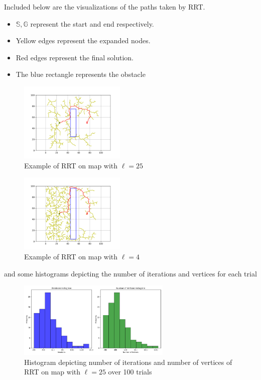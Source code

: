 \documentclass{article}
\begin{document}
Included below are the visualizations of the paths taken by RRT. 
\begin{itemize}
    \item $\mathbb{S},\mathbb{G}$ represent the start and end respectively. 
    \item Yellow edges represent the expanded nodes. 
    \item Red edges represent the final solution. 
    \item The blue rectangle represents the obstacle
\end{itemize}
\begin{figure}[H]
    \begin{center}
        \includegraphics[width=0.45\textwidth]{figures/final_path_RRT_1.png}
    \end{center}
    \caption{Example of RRT on map with $\ell=25$}\label{fig:RRT_1}
\end{figure}
\begin{figure}[H]
    \begin{center}
        \includegraphics[width=0.45\textwidth]{figures/final_path_RRT_2.png}
    \end{center}
    \caption{Example of RRT on map with $\ell=4$}\label{fig:RRT_2}
\end{figure}
and some histograms depicting the number of iterations and vertices for each trial
\begin{figure}[H]
    \begin{center}
        \includegraphics[width=0.65\textwidth]{figures/hist_RRT_1.png}
    \end{center}
    \caption{Histogram depicting number of iterations and number of
    vertices of RRT on map with $\ell=25$ over 100
trials}\label{fig:hist_RRT_1}
\end{figure}
\end{document}
